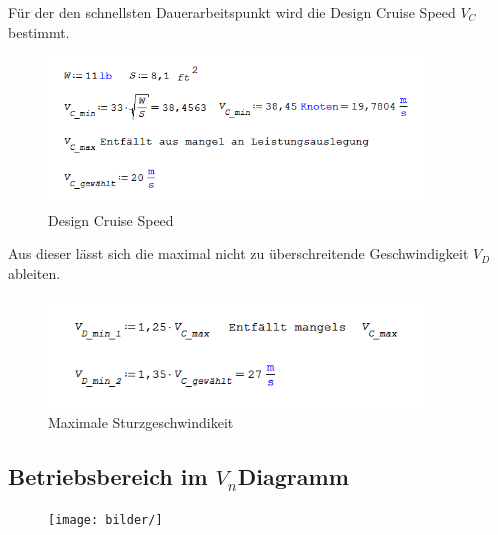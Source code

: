 Für der den schnellsten Dauerarbeitspunkt wird die Design Cruise Speed $V_{C}$ bestimmt.

\begin{figure}[H]
\centering
\includegraphics[width=0.9\textwidth]{bilder/Formeln/V_c.png}
\caption{Design Cruise Speed} 
\label{fig:Design Cruise Speed}
\end{figure}

Aus dieser lässt sich die maximal nicht zu überschreitende Geschwindigkeit $V_{D}$ ableiten.

\begin{figure}[H]
\centering
\includegraphics[width=0.9\textwidth]{bilder/Formeln/V_d.png}
\caption{Maximale Sturzgeschwindikeit} 
\label{fig:Maximale Sturzgeschwindikeit}
\end{figure}

\subsection{Betriebsbereich im $V_{n}$Diagramm}

\begin{figure}[H]
\centering
\texttt{[image: bilder/]}
\caption{} 
\label{fig:}
\end{figure}